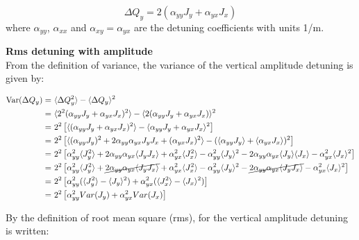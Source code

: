 \begin{equation}\label{eq:y_amplDetuning}
    \Delta Q_y = 2(\alpha_{yy}J_y + \alpha_{yx}J_x)
\end{equation}
where $\alpha_{yy}$, $\alpha_{xx}$ and $\alpha_{xy}=\alpha_{yx}$ are the detuning coefficients with units 1/m.


\normalsize{\textbf{Rms detuning with amplitude}}\\

From the definition of variance, the variance of the vertical amplitude detuning is given by:

\begin{equation}\label{eq:var_amplDetuning}
    \begin{split}
        \mathrm{Var}(\Delta Q_y) = &~\langle \Delta Q_y ^2 \rangle - \langle \Delta Q_y \rangle ^2 \\
        = &~\langle 2^2 (\alpha_{yy} J_y + \alpha_{yx}J_x)^2 \rangle - \langle 2(\alpha_{yy}J_y + \alpha_{yx}J_x) \rangle^2 \\
        = &~2^2 \left [ \langle (\alpha_{yy} J_y + \alpha_{yx}J_x)^2 \rangle - \langle \alpha_{yy}J_y + \alpha_{yx}J_x \rangle^2 \right ] \\
         = &~2^2 \left [  \langle (\alpha_{yy} J_y)^2 + 2\alpha_{yy}\alpha_{yx}J_yJ_x + (\alpha_{yx} J_x)^2  \rangle - (\langle \alpha_{yy}J_y \rangle + \langle \alpha_{yx}J_x \rangle )^2 \right ]\\
         =&~2^2\left [ \alpha_{yy}^2 \langle J_y^2 \rangle + 2\alpha_{yy}\alpha_{yx} \langle J_yJ_x \rangle + \alpha_{yx}^2 \langle J_x^2 \rangle -\alpha_{yy}^2  \langle J_y \rangle^2 - 2\alpha_{yy} \alpha_{yx} \langle J_y \rangle \langle J_x \rangle - \alpha_{yx} ^2 \langle J_x \rangle^2 \right ]\\
         =&~2^2\left [ \alpha_{yy}^2 \langle J_y^2 \rangle + \cancel{2\alpha_{yy}\alpha_{yx} \langle J_yJ_x \rangle} + \alpha_{yx}^2 \langle J_x^2 \rangle -\alpha_{yy}^2  \langle J_y \rangle^2 - \cancel{2\alpha_{yy} \alpha_{yx} \langle J_y J_x \rangle} - \alpha_{yx} ^2 \langle J_x \rangle^2 \right ]\\
         =&~2^2\left [ \alpha_{yy}^2(\langle J_y^2\rangle - \langle J_y \rangle^2 ) + \alpha_{yx}^2(\langle J_x^2\rangle - \langle J_x \rangle^2 ) \right ]\\
         =&~2^2\left [ \alpha_{yy}^2 Var(J_y) + \alpha_{yx}^2 Var(J_x) \right ]
    \end{split}
\end{equation}

By the definition of root mean square (rms), for the vertical amplitude detuning is written:

